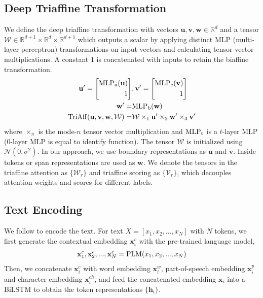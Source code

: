\documentclass[11pt]{article}
\begin{document}
\subsection{Deep Triaffine Transformation}
We define the deep triaffine transformation with vectors $\mathbf{u}, \mathbf{v}, \mathbf{w} \in \mathbb{R}^{d}$ and a tensor $\mathcal W \in \mathbb{R}^{d+1}\times\mathbb{R}^{d}\times\mathbb{R}^{d+1}$ which outputs a scalar by applying distinct MLP (multi-layer perceptron) transformations on input vectors and calculating tensor vector multiplications. A constant $1$ is concatenated with inputs to retain the biaffine transformation.
\begin{align}
    \mathbf{u}' = \left[
    	\begin{aligned}
    	    \mathbf{{\rm MLP_a}(u)} \\
    	    1
    	\end{aligned}
    	\right]&,
    \mathbf{v}' = \left[
    	\begin{aligned}
    	    \mathbf{{\rm MLP_c}(v)} \\
    	    1
    	\end{aligned}
    	\right] \\
\mathbf{w}'=&\mathbf{{\rm MLP_b}(w)}  \\
{\rm TriAff}(\mathbf{u}, \mathbf{v}, \mathbf{w}, {\mathcal W})=&
    	{\mathcal W} \times_{1} \mathbf{u}' \times_{2} \mathbf{w'} \times_{3} \mathbf{v}'
    \label{eq:tri}
\end{align}
where $\times_{n}$ is the mode-$n$ tensor vector multiplication and ${\rm MLP_t}$ is a $t$-layer MLP (0-layer MLP is equal to identify function).
The tensor $\mathcal W$ is initialized using $\mathcal N(0,\sigma^2)$.
In our approach, we use boundary representations as $\mathbf{u}$ and $\mathbf{v}$. Inside tokens or span representations are used as $\mathbf{w}$.
We denote the tensors in the triaffine attention as $\{\mathcal W_r\}$ and triaffine scoring as $\{\mathcal V_r\}$, which decouples attention weights and scores for different labels.

\subsection{Text Encoding}

We follow \citet{ju-etal-2018-neural,shen2021locate,tan2021sequence} to encode the text. For text $X = [x_1, x_2, ..., x_N]$ with $N$ tokens, we first generate the contextual embedding $\mathbf{x}_{i}^{c}$ with the pre-trained language model,
\begin{align}
    \mathbf{x}_{1}^{c}, \mathbf{x}_{2}^{c}, ..., \mathbf{x}_{N}^{c} = {\rm PLM}(x_1, x_2, ..., x_N)
\end{align}
Then, we concatenate $\mathbf{x}_{i}^{c}$ with word embedding $\mathbf{x}_i^{w}$, part-of-speech embedding $\mathbf{x}_i^{p}$ and character embedding $\mathbf{x}_i^{ch}$, and feed the concatenated embedding $\mathbf{x}_{i}$ into a BiLSTM \cite{hochreiter1997long} to obtain the token representations $\{\mathbf{h}_{i}\}$.
\end{document}
